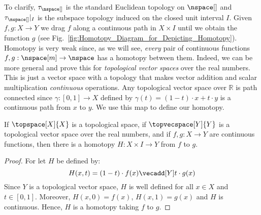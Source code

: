 \documentclass{book}                                                           %
\begin{document}
                To clarify, $\tau_{\nspace[]}$ is the standard Euclidean
                topology on $\nspace[]$ and $\tau_{\nspace[]}|_{I}$ is the
                subspace topology induced on the closed unit interval $I$. Given
                $f,g:X\rightarrow{Y}$ we drag $f$ along a continuous path in
                $X\times{I}$ until we obtain the function $g$
                (see Fig.~\ref{fig:Homotopy_Diagram_for_Depicting_Homotopy}).
                Homotopy is very weak since, as we will see, \textit{every} pair
                of continuous functions $f,g:\nspace[m]\rightarrow\nspace$ has a
                homotopy between them. Indeed, we can be more general and
                prove this for \textit{topological vector spaces} over the real
                numbers. This is just a vector space with a topology that makes
                vector addition and scalar multiplication \textit{continuous}
                operations. Any topological vector space over $\mathbb{R}$ is
                path connected since $\gamma:[0,1]\rightarrow{X}$ defined by
                $\gamma(t)=(1-t)\cdot{x}+t\cdot{y}$ is a continuous path from
                $x$ to $y$. We use this map to define our homotopy.
                \begin{theorem}
                    If $\topspace[X]{X}$ is a topological space, if
                    $\topvecspace[Y]{Y}$ is a topological vector space over the
                    real numbers, and if $f,g:X\rightarrow{Y}$ are continuous
                    functions, then there is a homotopy
                    $H:X\times{I}\rightarrow{Y}$ from $f$ to $g$.
                \end{theorem}
                \begin{proof}
                    For let $H$ be defined by:
                    \begin{equation}
                        \label{eqn:Straight_Line_Homotopy}%
                        H(x,t)=(1-t)\cdot{f}(x)\vecadd[Y]t\cdot{g}(x)
                    \end{equation}
                    Since $Y$ is a topological vector space, $H$ is well defined
                    for all $x\in{X}$ and $t\in[0,1]$. Moreover, $H(x,0)=f(x)$,
                    $H(x,1)=g(x)$ and $H$ is continuous. Hence, $H$ is a
                    homotopy taking $f$ to $g$.
                \end{proof}
\end{document}
